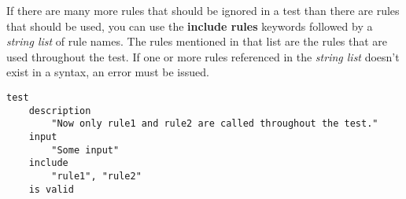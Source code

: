 

If there are many more rules that should be ignored in a test than there are
rules that should be used, you can use the \textbf{include rules} keywords
followed by a \textit{string list} of rule names. The rules mentioned in that 
list are the rules that are used throughout the test. If one or more rules 
referenced in the \textit{string list} doesn't exist in a syntax, an error must
be issued.
\clearpage

\begin{lstlisting}[style = SrtL]
test
    description
        "Now only rule1 and rule2 are called throughout the test."
    input 
        "Some input"
    include
        "rule1", "rule2"
    is valid
\end{lstlisting}